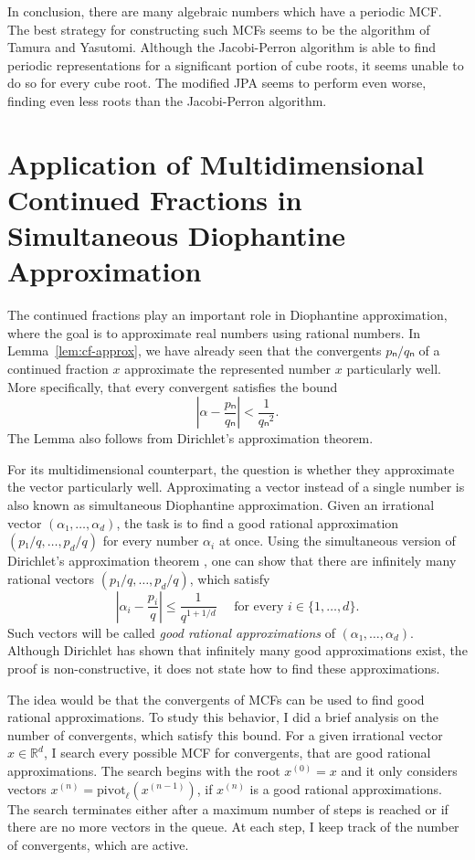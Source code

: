 In conclusion,
there are many algebraic numbers which have a periodic MCF.
The best strategy for constructing such MCFs seems to be the algorithm of Tamura and Yasutomi.
Although the Jacobi-Perron algorithm is able to find periodic representations
for a significant portion of cube roots, it seems unable to do so for every
cube root.
The modified JPA seems to perform even worse, finding even less roots than the
Jacobi-Perron algorithm.

\section{Application of Multidimensional Continued Fractions in Simultaneous Diophantine Approximation}

The continued fractions play an important role in Diophantine approximation,
where the goal is to approximate real numbers using rational numbers.
In Lemma~\vref{lem:cf-approx}, we have already seen that the convergents
$pₙ/qₙ$ of a continued fraction $x$ approximate the represented number $x$
particularly well.
More specifically, that every convergent satisfies the bound
\[
  \left|α - \frac{pₙ}{qₙ}\right| < \frac{1}{qₙ^2}.
\]
The Lemma also follows from Dirichlet's approximation theorem.

For its multidimensional counterpart,
the question is whether they approximate the vector particularly well.
Approximating a vector instead of a single number is also known as simultaneous
Diophantine approximation.
Given an irrational vector $(α₁, …, α_d)$, the task is to find a good
rational approximation $(p₁/q, …, p_d/q)$ for every number $α_i$ at once.
Using the simultaneous version of Dirichlet's approximation theorem \cite{Schmidt80},
one can show that there are infinitely many rational vectors $(p₁/q, …, p_d/q)$,
which satisfy
\begin{equation}
  \label{eq:sim-approx}
  \left|α_i - \frac{p_i}{q}\right| ≤ \frac{1}{q^{1 + 1/d}}
  \quad
  \text{ for every } i ∈ \{1, …, d\}.
\end{equation}
Such vectors will be called \emph{good rational approximations} of $(α₁, …, α_d)$.
Although Dirichlet has shown that infinitely many good approximations exist,
the proof is non-constructive, it does not state how to find these approximations.

The idea would be that the convergents of MCFs can be used to find good
rational approximations.
To study this behavior, I did a brief analysis on the number of convergents,
which satisfy this bound.
For a given irrational vector $x ∈ ℝ^d$,
I search every possible MCF for convergents, that are good rational approximations.
The search begins with the root $x^{(0)} = x$ and
it only considers vectors $x^{(n)} = \mathrm{pivot}_ℓ(x^{(n-1)})$,
if $x^{(n)}$ is a good rational approximations.
The search terminates either after a maximum number of steps is reached or if
there are no more vectors in the queue.
At each step, I keep track of the number of convergents,
which are active.


